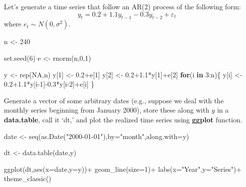 \documentclass[
  12pt,
  oneside]{book}
\newenvironment{Shaded}{\begin{snugshade}}{\end{snugshade}}
\newcommand{\AttributeTok}[1]{\textcolor[rgb]{0.77,0.63,0.00}{#1}}
\newcommand{\ConstantTok}[1]{\textcolor[rgb]{0.00,0.00,0.00}{#1}}
\newcommand{\ControlFlowTok}[1]{\textcolor[rgb]{0.13,0.29,0.53}{\textbf{#1}}}
\newcommand{\DecValTok}[1]{\textcolor[rgb]{0.00,0.00,0.81}{#1}}
\newcommand{\FloatTok}[1]{\textcolor[rgb]{0.00,0.00,0.81}{#1}}
\newcommand{\FunctionTok}[1]{\textcolor[rgb]{0.00,0.00,0.00}{#1}}
\newcommand{\NormalTok}[1]{#1}
\newcommand{\OtherTok}[1]{\textcolor[rgb]{0.56,0.35,0.01}{#1}}
\newcommand{\SpecialCharTok}[1]{\textcolor[rgb]{0.00,0.00,0.00}{#1}}
\newcommand{\StringTok}[1]{\textcolor[rgb]{0.31,0.60,0.02}{#1}}
\begin{document}
Let's generate a time series that follow an AR(2) process of the following form:
\[y_t = 0.2+1.1y_{t-1}-0.3y_{t-2}+\varepsilon_t\]
where \(e_{t} \sim N(0,\sigma^2)\).

\begin{Shaded}
\begin{Highlighting}[]
\NormalTok{n }\OtherTok{\textless{}{-}} \DecValTok{240}

\FunctionTok{set.seed}\NormalTok{(}\DecValTok{6}\NormalTok{)}
\NormalTok{e }\OtherTok{\textless{}{-}} \FunctionTok{rnorm}\NormalTok{(n,}\DecValTok{0}\NormalTok{,}\DecValTok{1}\NormalTok{)}

\NormalTok{y }\OtherTok{\textless{}{-}} \FunctionTok{rep}\NormalTok{(}\ConstantTok{NA}\NormalTok{,n)}
\NormalTok{y[}\DecValTok{1}\NormalTok{] }\OtherTok{\textless{}{-}} \FloatTok{0.2}\SpecialCharTok{+}\NormalTok{e[}\DecValTok{1}\NormalTok{]}
\NormalTok{y[}\DecValTok{2}\NormalTok{] }\OtherTok{\textless{}{-}} \FloatTok{0.2+1.1}\SpecialCharTok{*}\NormalTok{y[}\DecValTok{1}\NormalTok{]}\SpecialCharTok{+}\NormalTok{e[}\DecValTok{2}\NormalTok{]}
\ControlFlowTok{for}\NormalTok{(i }\ControlFlowTok{in} \DecValTok{3}\SpecialCharTok{:}\NormalTok{n)\{}
\NormalTok{  y[i] }\OtherTok{\textless{}{-}} \FloatTok{0.2+1.1}\SpecialCharTok{*}\NormalTok{y[i}\DecValTok{{-}1}\NormalTok{]}\SpecialCharTok{{-}}\FloatTok{0.3}\SpecialCharTok{*}\NormalTok{y[i}\DecValTok{{-}2}\NormalTok{]}\SpecialCharTok{+}\NormalTok{e[i]}
\NormalTok{\}}
\end{Highlighting}
\end{Shaded}

Generate a vector of some arbitrary dates (e.g., suppose we deal with the monthly series beginning from January 2000), store these along with \(y\) in a \textbf{data.table}, call it `dt,' and plot the realized time series using \textbf{ggplot} function.

\begin{Shaded}
\begin{Highlighting}[]
\NormalTok{date }\OtherTok{\textless{}{-}} \FunctionTok{seq}\NormalTok{(}\FunctionTok{as.Date}\NormalTok{(}\StringTok{"2000{-}01{-}01"}\NormalTok{),}\AttributeTok{by=}\StringTok{"month"}\NormalTok{,}\AttributeTok{along.with=}\NormalTok{y)}

\NormalTok{dt }\OtherTok{\textless{}{-}} \FunctionTok{data.table}\NormalTok{(date,y)}

\FunctionTok{ggplot}\NormalTok{(dt,}\FunctionTok{aes}\NormalTok{(}\AttributeTok{x=}\NormalTok{date,}\AttributeTok{y=}\NormalTok{y))}\SpecialCharTok{+}
  \FunctionTok{geom\_line}\NormalTok{(}\AttributeTok{size=}\DecValTok{1}\NormalTok{)}\SpecialCharTok{+}
  \FunctionTok{labs}\NormalTok{(}\AttributeTok{x=}\StringTok{"Year"}\NormalTok{,}\AttributeTok{y=}\StringTok{"Series"}\NormalTok{)}\SpecialCharTok{+}
  \FunctionTok{theme\_classic}\NormalTok{()}
\end{Highlighting}
\end{Shaded}
\end{document}
